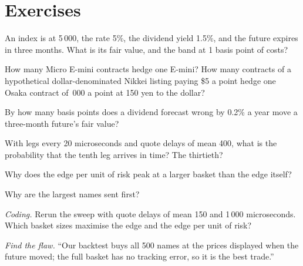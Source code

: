 \section{Exercises}

\begin{exercise}[$\star$]\label{exo:hf:index-and-basket-arbitrage:1}
An index is at 5\,000, the rate 5\%, the dividend yield 1.5\%, and the future expires in three months. What is its fair value, and the band at 1
basis point of costs?
\end{exercise}

\begin{exercise}[$\star$]\label{exo:hf:index-and-basket-arbitrage:2}
How many Micro E-mini contracts hedge one E-mini? How many contracts of a hypothetical dollar-denominated Nikkei listing paying \$5 a point hedge one Osaka contract of
\,000 a point at 150 yen to the dollar?
\end{exercise}

\begin{exercise}[$\star$]\label{exo:hf:index-and-basket-arbitrage:3}
By how many basis points does a dividend forecast wrong by 0.2\% a year move a three-month future's fair value?
\end{exercise}

\begin{exercise}[$\star\star$]\label{exo:hf:index-and-basket-arbitrage:4}
With legs every 20 microseconds and quote delays of mean 400, what is the probability that the tenth leg arrives in time? The thirtieth?
\end{exercise}

\begin{exercise}[$\star\star$]\label{exo:hf:index-and-basket-arbitrage:5}
Why does the edge per unit of risk peak at a larger basket than the edge itself?
\end{exercise}

\begin{exercise}[$\star\star$]\label{exo:hf:index-and-basket-arbitrage:6}
Why are the largest names sent first?
\end{exercise}

\begin{exercise}[$\star\star\star$]\label{exo:hf:index-and-basket-arbitrage:7}
\emph{Coding.} Rerun the sweep with quote delays of mean 150 and 1\,000 microseconds. Which basket sizes maximise the edge and the edge per unit of
risk?
\end{exercise}

\begin{exercise}[$\star\star\star$]\label{exo:hf:index-and-basket-arbitrage:8}
\emph{Find the flaw.} ``Our backtest buys all 500 names at the prices displayed when the future moved; the full basket has no tracking error, so it
is the best trade.''
\end{exercise}

